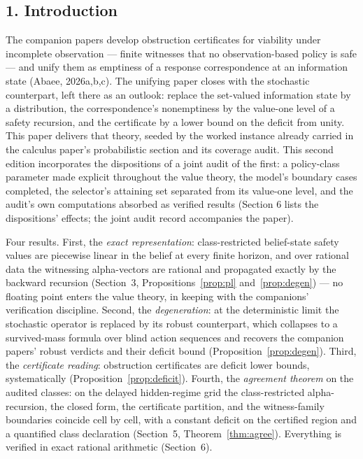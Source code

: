 \documentclass[10pt,twocolumn]{article}
\theoremstyle{definition}
\begin{document}
\subsection{1. Introduction}\label{introduction}

The companion papers develop obstruction certificates for viability under
incomplete observation --- finite witnesses that no observation-based policy
is safe --- and unify them as emptiness of a response correspondence at an
information state (Abaee, 2026a,b,c). The unifying paper closes with the
stochastic counterpart, left there as an outlook: replace the
set-valued information state by a distribution, the correspondence's
nonemptiness by the value-one level of a safety recursion, and the
certificate by a lower bound on the deficit from unity. This paper
delivers that theory, seeded by the worked instance already carried in the
calculus paper's probabilistic section and its coverage audit. This second
edition incorporates the dispositions of a joint audit of the first:
a policy-class parameter made explicit throughout the value theory, the
model's boundary cases completed, the selector's attaining set separated
from its value-one level, and the audit's own computations absorbed as
verified results (Section 6 lists the dispositions' effects; the joint
audit record accompanies the paper).

Four results. First, the \emph{exact representation}: class-restricted
belief-state safety values are piecewise linear in the belief at every
finite horizon, and over rational data the witnessing alpha-vectors are
rational and propagated exactly by the backward recursion (Section~3,
Propositions~\ref{prop:pl} and~\ref{prop:degen}) --- no floating point
enters the value theory, in keeping with the companions' verification
discipline. Second, the \emph{degeneration}: at the deterministic limit
the stochastic operator is replaced by its robust counterpart, which
collapses to a survived-mass formula over blind action sequences and
recovers the companion papers' robust verdicts and their deficit bound
(Proposition~\ref{prop:degen}). Third, the \emph{certificate reading}:
obstruction certificates are deficit lower bounds, systematically
(Proposition~\ref{prop:deficit}). Fourth, the \emph{agreement theorem} on
the audited classes: on the delayed hidden-regime grid the
class-restricted alpha-recursion, the closed form, the certificate
partition, and the witness-family boundaries coincide cell by cell, with a
constant deficit on the certified region and a quantified class
declaration (Section~5, Theorem~\ref{thm:agree}). Everything is verified
in exact rational arithmetic (Section~6).
\end{document}
